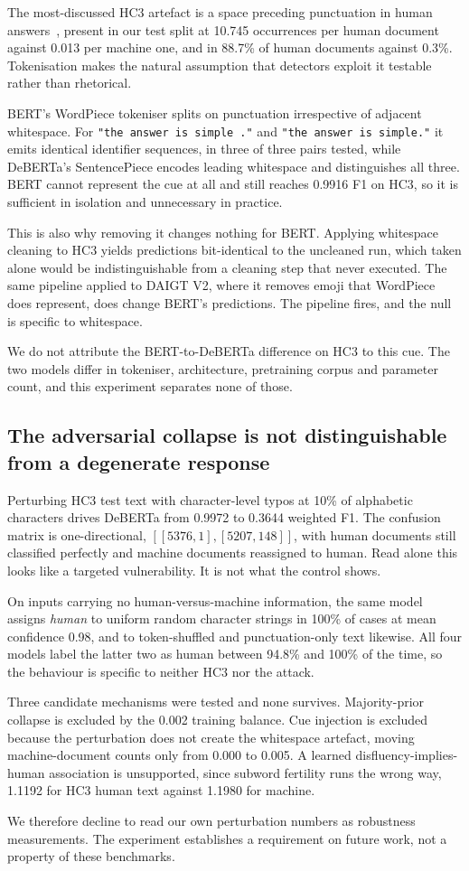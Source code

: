 The most-discussed HC3 artefact is a space preceding punctuation in human answers~\cite{Tian2023multiscale}, present in our test split at 10.745 occurrences per human document against 0.013 per machine one, and in 88.7\% of human documents against 0.3\%. Tokenisation makes the natural assumption that detectors exploit it testable rather than rhetorical.

BERT's WordPiece tokeniser splits on punctuation irrespective of adjacent whitespace. For \texttt{"the answer is simple ."} and \texttt{"the answer is simple."} it emits identical identifier sequences, in three of three pairs tested, while DeBERTa's SentencePiece encodes leading whitespace and distinguishes all three. BERT cannot represent the cue at all and still reaches 0.9916 F1 on HC3, so it is sufficient in isolation and unnecessary in practice.

This is also why removing it changes nothing for BERT. Applying whitespace cleaning to HC3 yields predictions bit-identical to the uncleaned run, which taken alone would be indistinguishable from a cleaning step that never executed. The same pipeline applied to DAIGT V2, where it removes emoji that WordPiece does represent, does change BERT's predictions. The pipeline fires, and the null is specific to whitespace.

We do not attribute the BERT-to-DeBERTa difference on HC3 to this cue. The two models differ in tokeniser, architecture, pretraining corpus and parameter count, and this experiment separates none of those.

\subsection{The adversarial collapse is not distinguishable from a degenerate response}

Perturbing HC3 test text with character-level typos at 10\% of alphabetic characters drives DeBERTa from 0.9972 to 0.3644 weighted F1. The confusion matrix is one-directional, $[[5376, 1], [5207, 148]]$, with human documents still classified perfectly and machine documents reassigned to human. Read alone this looks like a targeted vulnerability. It is not what the control shows.

On inputs carrying no human-versus-machine information, the same model assigns \emph{human} to uniform random character strings in 100\% of cases at mean confidence 0.98, and to token-shuffled and punctuation-only text likewise. All four models label the latter two as human between 94.8\% and 100\% of the time, so the behaviour is specific to neither HC3 nor the attack.

Three candidate mechanisms were tested and none survives. Majority-prior collapse is excluded by the 0.002 training balance. Cue injection is excluded because the perturbation does not create the whitespace artefact, moving machine-document counts only from 0.000 to 0.005. A learned disfluency-implies-human association is unsupported, since subword fertility runs the wrong way, 1.1192 for HC3 human text against 1.1980 for machine.

We therefore decline to read our own perturbation numbers as robustness measurements. The experiment establishes a requirement on future work, not a property of these benchmarks.
